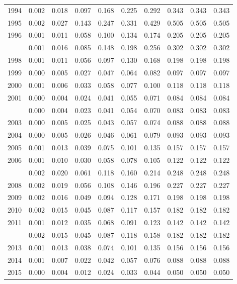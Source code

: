 \documentclass[
]{article}
\begin{document}
\begin{longtable}[t]{lrrrrrrrrr}
1994 & 0.002 & 0.018 & 0.097 & 0.168 & 0.225 & 0.292 & 0.343 & 0.343 & 0.343\\
1995 & 0.002 & 0.027 & 0.143 & 0.247 & 0.331 & 0.429 & 0.505 & 0.505 & 0.505\\
1996 & 0.001 & 0.011 & 0.058 & 0.100 & 0.134 & 0.174 & 0.205 & 0.205 & 0.205\\
\addlinespace
1997 & 0.001 & 0.016 & 0.085 & 0.148 & 0.198 & 0.256 & 0.302 & 0.302 & 0.302\\
1998 & 0.001 & 0.011 & 0.056 & 0.097 & 0.130 & 0.168 & 0.198 & 0.198 & 0.198\\
1999 & 0.000 & 0.005 & 0.027 & 0.047 & 0.064 & 0.082 & 0.097 & 0.097 & 0.097\\
2000 & 0.001 & 0.006 & 0.033 & 0.058 & 0.077 & 0.100 & 0.118 & 0.118 & 0.118\\
2001 & 0.000 & 0.004 & 0.024 & 0.041 & 0.055 & 0.071 & 0.084 & 0.084 & 0.084\\
\addlinespace
2002 & 0.000 & 0.004 & 0.023 & 0.041 & 0.054 & 0.070 & 0.083 & 0.083 & 0.083\\
2003 & 0.000 & 0.005 & 0.025 & 0.043 & 0.057 & 0.074 & 0.088 & 0.088 & 0.088\\
2004 & 0.000 & 0.005 & 0.026 & 0.046 & 0.061 & 0.079 & 0.093 & 0.093 & 0.093\\
2005 & 0.001 & 0.013 & 0.039 & 0.075 & 0.101 & 0.135 & 0.157 & 0.157 & 0.157\\
2006 & 0.001 & 0.010 & 0.030 & 0.058 & 0.078 & 0.105 & 0.122 & 0.122 & 0.122\\
\addlinespace
2007 & 0.002 & 0.020 & 0.061 & 0.118 & 0.160 & 0.214 & 0.248 & 0.248 & 0.248\\
2008 & 0.002 & 0.019 & 0.056 & 0.108 & 0.146 & 0.196 & 0.227 & 0.227 & 0.227\\
2009 & 0.002 & 0.016 & 0.049 & 0.094 & 0.128 & 0.171 & 0.198 & 0.198 & 0.198\\
2010 & 0.002 & 0.015 & 0.045 & 0.087 & 0.117 & 0.157 & 0.182 & 0.182 & 0.182\\
2011 & 0.001 & 0.012 & 0.035 & 0.068 & 0.091 & 0.123 & 0.142 & 0.142 & 0.142\\
\addlinespace
2012 & 0.002 & 0.015 & 0.045 & 0.087 & 0.118 & 0.158 & 0.182 & 0.182 & 0.182\\
2013 & 0.001 & 0.013 & 0.038 & 0.074 & 0.101 & 0.135 & 0.156 & 0.156 & 0.156\\
2014 & 0.001 & 0.007 & 0.022 & 0.042 & 0.057 & 0.076 & 0.088 & 0.088 & 0.088\\
2015 & 0.000 & 0.004 & 0.012 & 0.024 & 0.033 & 0.044 & 0.050 & 0.050 & 0.050\\

\end{longtable}
\end{document}
